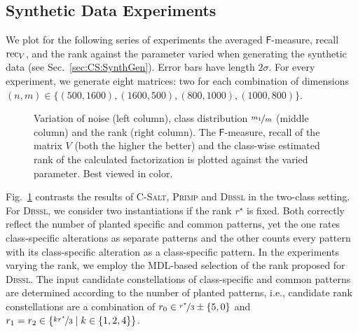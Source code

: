 \subsection{Synthetic Data Experiments}\label{sec:CS:synthExp}
We plot for the following series of experiments the averaged $\mathsf{F}$-measure, recall $\operatorname{rec}_V$, and the rank against the parameter varied when generating the synthetic data  (see Sec.~\ref{sec:CS:SynthGen}). Error bars have length $2\sigma$. For every experiment, we generate eight matrices: two for each combination of dimensions $(n,m)\in\{(500,1600),\allowbreak(1600,500),\allowbreak(800,1000),\allowbreak(1000,800)\}$.
\begin{figure}[t!]
\centering

\caption{Variation of noise (left column), class distribution $\nicefrac{m_1}{m}$ (middle column) and the rank (right column). The $\mathsf{F}$-measure, recall of the matrix $V$ (both the higher the better) and the class-wise estimated rank of the calculated factorization is plotted against the varied parameter. Best viewed in color.}
\label{fig:noise}
\end{figure}

Fig.~\ref{fig:noise} contrasts the results of \textsc{C-Salt}, \textsc{Primp} and \textsc{Dbssl} in the two-class setting. For \textsc{Dbssl}, we consider two instantiations if the rank $r^\star$ is fixed. Both correctly reflect the number of planted specific and common patterns, yet the one rates class-specific alterations as separate patterns and the other counts every pattern with its class-specific alteration as a class-specific pattern. In the experiments varying the rank, we employ the MDL-based selection of the rank proposed for \textsc{Dbssl}. The input candidate constellations of class-specific and common patterns are determined according to the number of planted patterns, i.e., candidate rank constellations are a combination of $r_0\in \nicefrac{r^\star}{3}\pm\{5,0\}$ and  $r_{1}=r_2\in \{\nicefrac{kr^\star}{3}\mid k\in \{1,2,4\}\}$.

